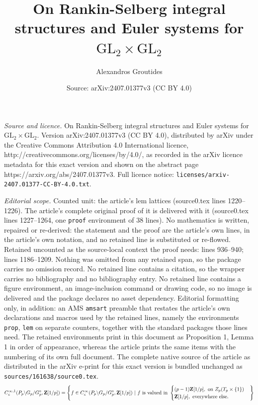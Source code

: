 \documentclass[10pt,a4paper]{amsart}
\title{On Rankin-Selberg integral structures and Euler systems for $\mathrm{GL}_2\times \mathrm{GL}_2$}
\author{Alexandros Groutides}
\date{Source: arXiv:2407.01377v3 (CC BY 4.0)}
\newcommand\scalemath[2]{\scalebox{#1}{\mbox{\ensuremath{\displaystyle #2}}}}
\begin{document}
\maketitle

\noindent\emph{Source and licence.} On Rankin-Selberg integral structures and Euler systems for $\mathrm{GL}_2\times \mathrm{GL}_2$. Version arXiv:2407.01377v3 (CC BY 4.0), distributed by arXiv under the Creative Commons Attribution 4.0 International licence, http://creativecommons.org/licenses/by/4.0/, as recorded in the arXiv licence metadata for this exact version and shown on the abstract page https://arxiv.org/abs/2407.01377v3. Full licence notice: \texttt{licenses/arxiv-2407.01377-CC-BY-4.0.txt}.\par\smallskip

\noindent\textit{Editorial scope.} Counted unit: the article's lem lattices (source0.tex lines 1220--1226). The article's complete original proof of it is delivered with it (source0.tex lines 1227--1264, one \texttt{proof} environment of 38 lines). No mathematics is written, repaired or re-derived: the statement and the proof are the article's own lines, in the article's own notation, and no retained line is substituted or re-flowed.  Retained uncounted as the source-local context the proof needs: lines 936--940; lines 1186--1209.  Nothing was omitted from any retained span, so the package carries no omission record.  No retained line contains a citation, so the wrapper carries no bibliography and no bibliography entry.  No retained line contains a figure environment, an image-inclusion command or drawing code, so no image is delivered and the package declares no asset dependency.  Editorial formatting only, in addition: an AMS \texttt{amsart} preamble that restates the article's own declarations and macros used by the retained lines, namely the environments \texttt{prop}, \texttt{lem} on separate counters, together with the standard packages those lines need.  The retained environments print in this document as Proposition 1, Lemma 1 in order of appearance, whereas the article prints the same items with the numbering of its own full document.  The complete native source of the article as distributed in the arXiv e-print for this exact version is bundled unchanged as \texttt{sources/161638/source0.tex}.
\begin{align}\label{eq:111}
\scalemath{0.95}{C_c^{\infty,1}(P_p\backslash G_p/G_p^\circ,\mathbf{Z}[1/p])=\left\{f\in C_c^\infty(P_p\backslash G_p/G_p^\circ,\mathbf{Z}[1/p])\ |\ f\ \text{is valued in}\ \begin{cases}
    (p-1)\mathbf{Z}[1/p],\ \text{on}\ Z_p(T_p\times \{1\}) \\
    \mathbf{Z}[1/p],\ \text{everywhere else.}
\end{cases}\right\}}\end{align}
\end{document}
